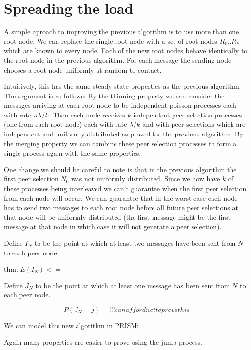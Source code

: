 \documentclass[a4paper,10pt]{article}
\newcommand{\prismmodel}[1]{
  \begin{quotation}
  \footnotesize
  
  \end{quotation}
}
\begin{document}
\section{Spreading the load}

A simple aproach to improving the previous algorithm is to use more than one root node. We can replace the single root node with a set of root nodes $R_0 .. R_k$ which are known to every node. Each of the new root nodes behave identically to the root node in the previous algorithm. For each message the sending node chooses a root node uniformly at random to contact. 

Intuitively, this has the same steady-state properties as the previous algorithm. The argument is as follows: By the thinning property we can consider the messages arriving at each root node to be independent poisson processes each with rate $n \lambda / k$. Then each node receives $k$ independent peer selection processes (one from each root node) each with rate $\lambda / k$ and with peer selections which are independent and uniformly distributed as proved for the previous algorithm. By the merging property we can combine these peer selection processes to form a single process again with the same properties. 

One change we should be careful to note is that in the previous algorithm the first peer selection $N_0$ was not uniformly distributed. Since we now have $k$ of these processes being interleaved we can't guarantee when the first peer selection from each node will occur. We can guarantee that in the worst case each node has to send two messages to each root node before all future peer selections at that node will be uniformly distributed (the first message might be the first message at that node in which case it will not generate a peer selection).

Define $I_N$ to be the point at which at least two messages have been sent from $N$ to each peer node.

thm: $E(I_N) <=$ 

Define $J_N$ to be the point at which at least one message has been sent from $N$ to each peer node.

$$
P(J_N = j)
= !!! can afford not to prove this
$$
 
We can model this new algorithm in PRISM:

\prismmodel{ctmc_multiple}

Again many properties are easier to prove using the jump process.

\prismmodel{dtmc_multiple}
\end{document}
